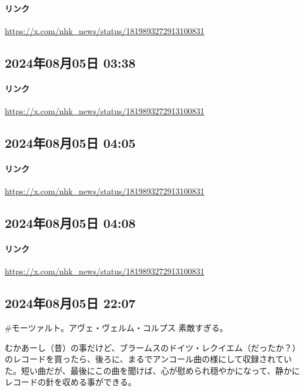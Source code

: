 \paragraph{リンク}
\url{https://x.com/nhk_news/status/1819893272913100831}

\subsection*{2024年08月05日 03:38}

\paragraph{リンク}
\url{https://x.com/nhk_news/status/1819893272913100831}

\subsection*{2024年08月05日 04:05}

\paragraph{リンク}
\url{https://x.com/nhk_news/status/1819893272913100831}

\subsection*{2024年08月05日 04:08}

\paragraph{リンク}
\url{https://x.com/nhk_news/status/1819893272913100831}

\subsection*{2024年08月05日 22:07}

\#モーツァルト。アヴェ・ヴェルム・コルプス 素敵すぎる。

むかあーし（昔）の事だけど、ブラームスのドイツ・レクイエム（だったか？）のレコードを買ったら、後ろに、まるでアンコール曲の様にして収録されていた。短い曲だが、最後にこの曲を聞けば、心が慰められ穏やかになって、静かにレコードの針を収める事ができる。

